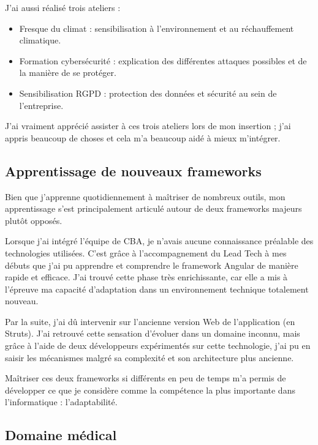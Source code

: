 \documentclass{article}
\begin{document}
J'ai aussi réalisé trois ateliers :

\begin{itemize}
    \item Fresque du climat : sensibilisation à l'environnement et au réchauffement climatique.
    \item Formation cybersécurité : explication des différentes attaques possibles et de la manière de se protéger.
    \item Sensibilisation RGPD : protection des données et sécurité au sein de l'entreprise.
\end{itemize}

J'ai vraiment apprécié assister à ces trois ateliers lors de mon insertion ; j'ai appris beaucoup de choses et cela m'a beaucoup aidé à mieux m'intégrer.

\newpage

\subsection{Apprentissage de nouveaux frameworks}

Bien que j'apprenne quotidiennement à maîtriser de nombreux outils, mon apprentissage s'est principalement articulé autour de deux frameworks majeurs plutôt opposés.

Lorsque j'ai intégré l'équipe de CBA, je n'avais aucune connaissance préalable des technologies utilisées. C'est grâce à l'accompagnement du Lead Tech à mes débuts que j'ai pu apprendre et comprendre le framework Angular de manière rapide et efficace. J'ai trouvé cette phase très enrichissante, car elle a mis à l'épreuve ma capacité d'adaptation dans un environnement technique totalement nouveau.

Par la suite, j'ai dû intervenir sur l'ancienne version Web de l'application (en Struts). J'ai retrouvé cette sensation d'évoluer dans un domaine inconnu, mais grâce à l'aide de deux développeurs expérimentés sur cette technologie, j'ai pu en saisir les mécanismes malgré sa complexité et son architecture plus ancienne.

Maîtriser ces deux frameworks si différents en peu de temps m'a permis de développer ce que je considère comme la compétence la plus importante dans l'informatique : l'adaptabilité.

\subsection{Domaine médical}
\end{document}
